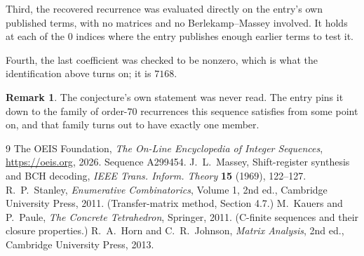 \documentclass[11pt,a4paper]{article}
\theoremstyle{plain}
\theoremstyle{definition}
\newtheorem{remark}[theorem]{Remark}
\begin{document}
Third, the recovered recurrence was evaluated directly on the entry's own published terms, with
no matrices and no Berlekamp--Massey involved. It holds at each of the $0$ indices where
the entry publishes enough earlier terms to test it.

Fourth, the last coefficient was checked to be nonzero, which is what the identification above
turns on; it is $7168$.

\begin{remark}
The conjecture's own statement was never read. The entry pins it down to the family of
order-$70$ recurrences this sequence satisfies from some point on, and that family turns
out to have exactly one member.
\end{remark}

\begin{thebibliography}{9}
 The OEIS Foundation, \emph{The On-Line Encyclopedia of Integer
Sequences}, \url{https://oeis.org}, 2026. Sequence A299454.
 J.~L.~Massey, Shift-register synthesis and BCH decoding, \emph{IEEE
Trans. Inform. Theory} \textbf{15} (1969), 122--127.
 R.~P.~Stanley, \emph{Enumerative Combinatorics}, Volume 1, 2nd ed.,
Cambridge University Press, 2011. (Transfer-matrix method, Section 4.7.)
 M.~Kauers and P.~Paule, \emph{The Concrete Tetrahedron}, Springer, 2011.
(C-finite sequences and their closure properties.)
 R.~A.~Horn and C.~R.~Johnson, \emph{Matrix Analysis}, 2nd ed., Cambridge
University Press, 2013.
\end{thebibliography}
\end{document}
